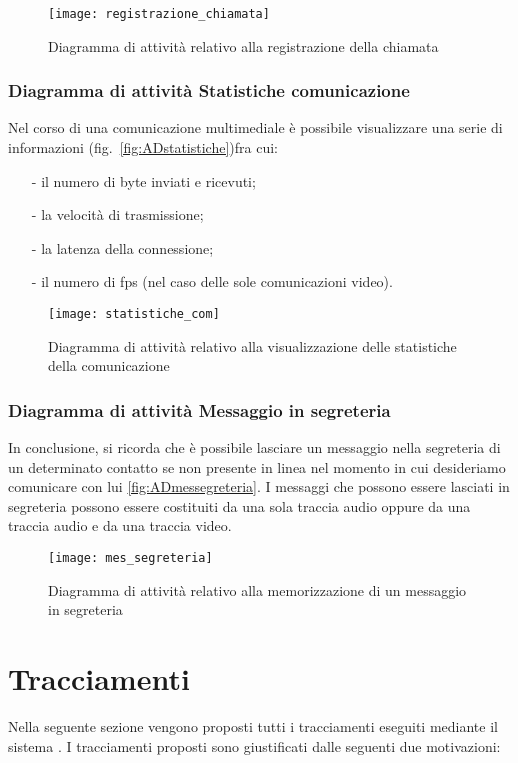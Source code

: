 \begin{figure}[H]
\centering
\texttt{[image: registrazione\_chiamata]}
\caption{Diagramma di attività relativo alla registrazione della chiamata}\label{fig:ADregistrachiamata}
\end{figure}

\subsubsection{Diagramma di attività Statistiche comunicazione}
Nel corso di una comunicazione multimediale è possibile visualizzare una serie di informazioni (fig.~\vref{fig:ADstatistiche})fra cui:
\begin{itemize}[noitemsep,nolistsep]
  \item[-] il numero di byte inviati e ricevuti;
  \item[-] la velocità di trasmissione;
  \item[-] la latenza della connessione;
  \item[-] il numero di fps (nel caso delle sole comunicazioni video).
\end{itemize}

\begin{figure}[H]
\centering
\texttt{[image: statistiche\_com]}
\caption{Diagramma di attività relativo alla visualizzazione delle statistiche della comunicazione}\label{fig:ADstatistiche}
\end{figure}

\subsubsection{Diagramma di attività Messaggio in segreteria}
In conclusione, si ricorda che è possibile lasciare un messaggio nella segreteria di un determinato contatto se non presente in linea nel momento in cui desideriamo comunicare con lui \vref{fig:ADmessegreteria}. I messaggi che possono essere lasciati in segreteria possono essere costituiti da una sola traccia audio oppure da una traccia audio e da una traccia video.

\begin{figure}[H]
\centering
\texttt{[image: mes\_segreteria]}
\caption{Diagramma di attività relativo alla memorizzazione di un messaggio in segreteria}\label{fig:ADmessegreteria}
\end{figure}
\clearpage

\section{Tracciamenti}\label{sec:tracciamenti}
Nella seguente sezione vengono proposti tutti i tracciamenti eseguiti mediante il sistema \manager. I tracciamenti proposti sono giustificati dalle seguenti due motivazioni:

